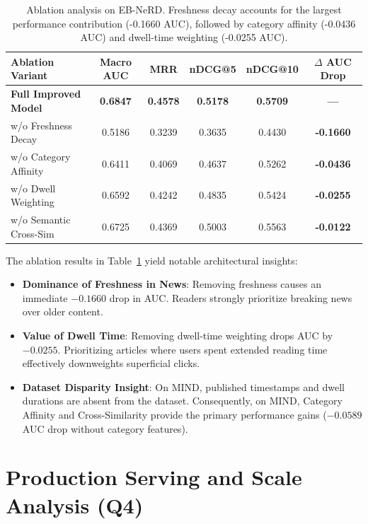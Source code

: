 \documentclass[11pt,a4paper]{article}
\begin{document}
\begin{table}[htbp]
\centering
\small
\setlength{\tabcolsep}{4.5pt}
\begin{tabular}{lccccc}
\toprule
\textbf{Ablation Variant} & \textbf{Macro AUC} & \textbf{MRR} & \textbf{nDCG@5} & \textbf{nDCG@10} & \textbf{$\Delta$ AUC Drop} \\
\midrule
\textbf{Full Improved Model} & \textbf{0.6847} & \textbf{0.4578} & \textbf{0.5178} & \textbf{0.5709} & \textbf{---} \\
\quad w/o Freshness Decay & 0.5186 & 0.3239 & 0.3635 & 0.4430 & \textbf{-0.1660} \\
\quad w/o Category Affinity & 0.6411 & 0.4069 & 0.4637 & 0.5262 & \textbf{-0.0436} \\
\quad w/o Dwell Weighting & 0.6592 & 0.4242 & 0.4835 & 0.5424 & \textbf{-0.0255} \\
\quad w/o Semantic Cross-Sim & 0.6725 & 0.4369 & 0.5003 & 0.5563 & \textbf{-0.0122} \\
\bottomrule
\end{tabular}
\caption{Ablation analysis on EB-NeRD. Freshness decay accounts for the largest performance contribution (-0.1660 AUC), followed by category affinity (-0.0436 AUC) and dwell-time weighting (-0.0255 AUC).}
\label{tab:ablation}
\end{table}

The ablation results in Table~\ref{tab:ablation} yield notable architectural insights:
\begin{itemize}[noitemsep,topsep=1pt,leftmargin=*]
    \item \textbf{Dominance of Freshness in News}: Removing freshness causes an immediate $-0.1660$ drop in AUC. Readers strongly prioritize breaking news over older content.
    \item \textbf{Value of Dwell Time}: Removing dwell-time weighting drops AUC by $-0.0255$. Prioritizing articles where users spent extended reading time effectively downweights superficial clicks.
    \item \textbf{Dataset Disparity Insight}: On MIND, published timestamps and dwell durations are absent from the dataset. Consequently, on MIND, Category Affinity and Cross-Similarity provide the primary performance gains ($-0.0589$ AUC drop without category features).
\end{itemize}

\section{Production Serving and Scale Analysis (Q4)}
\end{document}

